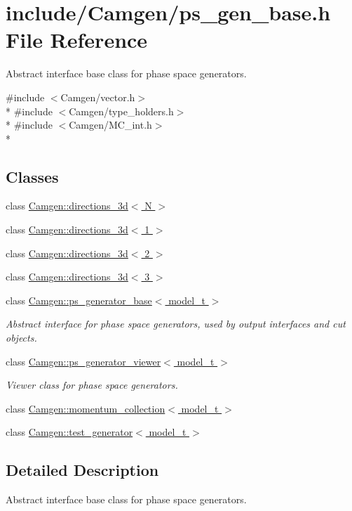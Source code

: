 \hypertarget{a00743}{}\section{include/\+Camgen/ps\+\_\+gen\+\_\+base.h File Reference}
\label{a00743}


Abstract interface base class for phase space generators.  


{\ttfamily \#include $<$Camgen/vector.\+h$>$}\\*
{\ttfamily \#include $<$Camgen/type\+\_\+holders.\+h$>$}\\*
{\ttfamily \#include $<$Camgen/\+M\+C\+\_\+int.\+h$>$}\\*
\subsection*{Classes}
\begin{DoxyCompactItemize}
\item 
class \hyperlink{a00132}{Camgen\+::directions\+\_\+3d$<$ N $>$}
\item 
class \hyperlink{a00133}{Camgen\+::directions\+\_\+3d$<$ 1 $>$}
\item 
class \hyperlink{a00134}{Camgen\+::directions\+\_\+3d$<$ 2 $>$}
\item 
class \hyperlink{a00135}{Camgen\+::directions\+\_\+3d$<$ 3 $>$}
\item 
class \hyperlink{a00451}{Camgen\+::ps\+\_\+generator\+\_\+base$<$ model\+\_\+t $>$}
\begin{DoxyCompactList}\small\item\em Abstract interface for phase space generators, used by output interfaces and cut objects. \end{DoxyCompactList}\item 
class \hyperlink{a00454}{Camgen\+::ps\+\_\+generator\+\_\+viewer$<$ model\+\_\+t $>$}
\begin{DoxyCompactList}\small\item\em Viewer class for phase space generators. \end{DoxyCompactList}\item 
class \hyperlink{a00376}{Camgen\+::momentum\+\_\+collection$<$ model\+\_\+t $>$}
\item 
class \hyperlink{a00544}{Camgen\+::test\+\_\+generator$<$ model\+\_\+t $>$}
\end{DoxyCompactItemize}


\subsection{Detailed Description}
Abstract interface base class for phase space generators. 

